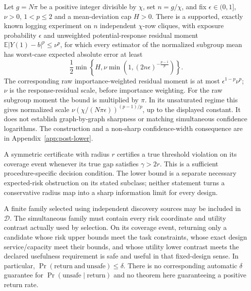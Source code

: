 \begin{proposition}
\label{prop:post-lower}
Let $g=N\pi$ be a positive integer divisible by $\chi$, set $n=g/\chi$, and
fix $\epsilon\in(0,1]$, $\nu>0$, $1<p\leq2$ and a mean-deviation cap $H>0$.
There is a supported, exactly known logging experiment on $n$ independent
$\chi$-row cliques, with exposure probability $\epsilon$ and unweighted
potential-response residual moment
$\mathbb E|Y(1)-b|^p\leq\nu^p$, for which every estimator of the normalized
subgroup mean has worst-case expected absolute error at least
\begin{equation}
 \frac12\min\left\{H,
 \nu\min\left(1,(2n\epsilon)^{-\frac{p-1}{p}}\right)\right\}.
 \label{eq:post-lower}
\end{equation}
The corresponding raw importance-weighted residual moment is at most
$\epsilon^{1-p}\nu^p$; $\nu$ is the response-residual scale, before
importance weighting. For the raw subgroup moment the bound is multiplied
by $\pi$. In its
unsaturated regime this gives normalized scale
$\nu(\chi/(N\pi\epsilon))^{(p-1)/p}$, up to the displayed constant.
It does not establish graph-by-graph sharpness or matching simultaneous
confidence logarithms. The construction and a non-sharp confidence-width
consequence are in Appendix~\ref{app:post-lower}.
\end{proposition}

A symmetric certificate with radius $r$ certifies a true threshold violation
on its coverage event whenever its true gap satisfies $\gamma>2r$.
This is a sufficient procedure-specific decision condition. The lower bound
is a separate necessary expected-risk obstruction on its stated subclass;
neither statement turns a conservative radius map into a sharp information
limit for every design.

\begin{corollary}
\label{cor:post-selection}
A finite family selected using independent discovery sources may be included
in $\mathcal D$. The simultaneous family must contain every risk coordinate
and utility contrast actually used by selection. On its coverage event,
returning only a candidate whose risk upper bounds meet the task constraints,
whose exact design service/capacity meet their bounds, and whose utility lower
contrast meets the declared usefulness requirement is safe and useful in that
fixed-design sense. In particular,
$\Pr(\mathrm{return}\ \mathrm{and}\ \mathrm{unsafe})\leq\delta$.
There is no corresponding automatic $\delta$ guarantee for
$\Pr(\mathrm{unsafe}\mid\mathrm{return})$ and no theorem here guaranteeing
a positive return rate.
\end{corollary}

